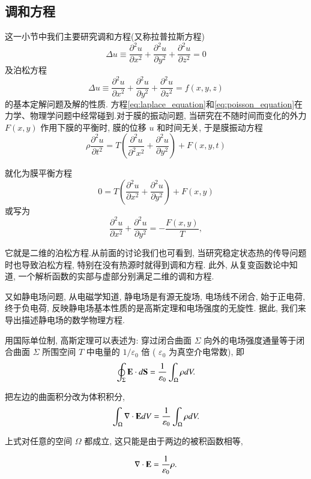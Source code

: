 \subsection{调和方程}
这一小节中我们主要研究调和方程(又称拉普拉斯方程)
\begin{equation}
    \Delta u \equiv \frac{\partial^2 u}{\partial x^2}+\frac{\partial^2 u}{\partial y^2}+\frac{\partial^2 u}{\partial z^2}=0
    \label{eq:laplace_equation}
\end{equation}
及泊松方程
\begin{equation}
    \Delta u \equiv \frac{\partial^2 u}{\partial x^2}+\frac{\partial^2 u}{\partial y^2}+\frac{\partial^2 u}{\partial z^2}=f(x, y, z)
    \label{eq:poisson_equation}
\end{equation}
的基本定解问题及解的性质.
方程\ref{eq:laplace_equation}和\ref{eq:poisson_equation}在力学、物理学问题中经常碰到.对于膜的振动问题, 
当研究在不随时间而变化的外力 $F(x, y)$ 
作用下膜的平衡时, 膜的位移 $u$ 和时间无关, 于是膜振动方程
$$
\rho \frac{\partial^2 u}{\partial t^2}=T\left(\frac{\partial^2 u}{\partial^2 x^2}
+\frac{\partial^2 u}{\partial y^2}\right)+F(x, y, t)
$$

就化为膜平衡方程
$$
0=T\left(\frac{\partial^2 u}{\partial x^2}+\frac{\partial^2 u}{\partial y^2}\right)+F(x, y)
$$
或写为
$$
\frac{\partial^2 u}{\partial x^2}+\frac{\partial^2 u}{\partial y^2}=-\frac{F(x, y)}{T},
$$

它就是二维的泊松方程.从前面的讨论我们也可看到, 
当研究稳定状态热的传导问题时也导致泊松方程, 特别在没有热源时就得到调和方程. 
此外, 从复变函数论中知道, 一个解析函数的实部与虚部分别满足二维的调和方程.

又如静电场问题, 从电磁学知道, 静电场是有源无旋场, 电场线不闭合, 始于正电荷, 
终于负电荷, 反映静电场基本性质的是高斯定理和电场强度的无旋性. 据此, 我们来导出描述静电场的数学物理方程.

用国际单位制, 高斯定理可以表述为: 穿过闭合曲面 $\Sigma$ 向外的电场强度通量等于闭合曲面 $\Sigma$ 
所围空间 $T$ 中电量的 $1 / \varepsilon_0$ 倍 ( $\varepsilon_0$ 为真空介电常数), 即
$$
\oint_{\Sigma} {\mathbf{E}} \cdot d {\mathbf{S}}=\frac{1}{\varepsilon_0} \int_{\Omega} \rho d V .
$$

把左边的曲面积分改为体积积分,
$$
\int_{\Omega} \nabla \cdot {\mathbf{E}} d V=\frac{1}{\varepsilon_0} \int_{\Omega} \rho d V .
$$

上式对任意的空间 $\Omega$ 都成立, 这只能是由于两边的被积函数相等,

\begin{equation}
    \nabla \cdot {\mathbf{E}}=\frac{1}{\varepsilon_0} \rho .
    \label{eq:nabla_dot_E}
\end{equation}

